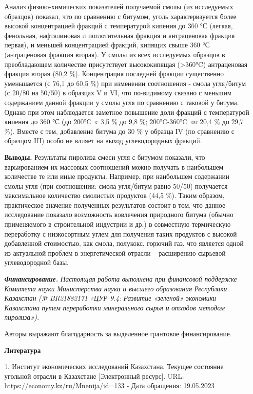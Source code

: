 Анализ физико-химических показателей получаемой смолы (из исследуемых
образцов) показал, что по сравнению с битумом, уголь характеризуется
более высокой концентрацией фракций с температурой кипения до 360 °С
(легкая, фенольная, нафталиновая и поглотительная фракция и антраценовая
фракция первая), и меньшей концентрацией фракций, кипящих свыше 360 °С
(антраценовая фракция вторая). У смолы из всех исследуемых образцов в
преобладающем количестве присутствует высококипящая (\textgreater360°C)
антраценовая фракция вторая (80,2 \%). Концентрация последней фракции
существенно уменьшается (с 76,1 до 60,5 \%) при изменении соотношения -
смола угля/битум (с 20/80 на 50/50) в образцах V и VI, что по-видимому
связано с меньшим содержанием данной фракции у смолы угля по сравнению с
таковой у битума. Однако при этом наблюдается заметное повышение доли
фракций с температурой кипения до 360 °С (до 200°C ̶ с 3,5 \% до 9,8 \%;
200°C-360°C ̶ от 20,4 \% до 29,7 \%). Вместе с тем, добавление битума до
30 \% у образца IV (по сравнению с образцом III) особо не влияет на
выход углеводородных фракций.

{\bfseries Выводы.} Результаты пиролиза смеси угля с битумом показали, что
варьированием их массовых соотношений можно получать в наибольшем
количестве те или иные продукты. Например, при наибольшем содержании
смолы угля (при соотношении: смола угля/битум равно 50/50) получается
максимальное количество смолистых продуктов (44,5 \%). Таким образом,
практическое значение полученных результатов состоит в том, что данное
исследование показало возможность вовлечения природного битума (обычно
применяемого в строительной индустрии и др.) в совместную термическую
переработку с низкосортным углем для получения таких продуктов с высокой
добавленной стоимостью, как смола, полукокс, горючий газ, что является
одной из актуальной проблем в энергетической отрасли -- расширению
сырьевой углеводородной базы.

\emph{{\bfseries Финансирование.} Настоящая работа выполнена при финансовой
поддержке Комитета науки Министерства науки и высшего образования
Республики Казахстан (№ BR21882171 «ЦУР 9.4: Развитие «зеленой»
экономики Казахстана путем переработки минерального сырья и отходов
методом пиролиза»).}

Авторы выражают благодарность за выделенное грантовое финансирование.

{\bfseries Литература}

1. Институт экономических исследований Казахстана. Текущее состояние
угольной отрасли в Казахстане {[}Электронный ресурс{]}. URL:
https://economy.kz/ru/Mnenija/id=133 - Дата обращения: 19.05.2023

